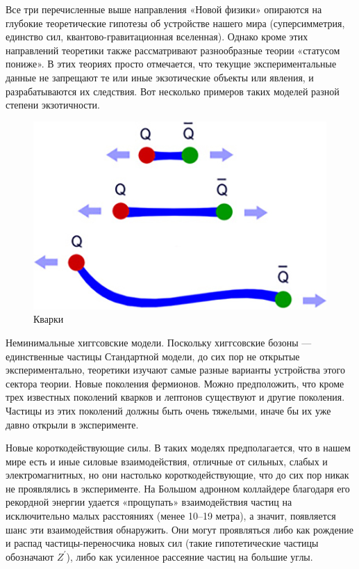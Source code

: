 Все три перечисленные выше направления «Новой физики» опираются на глубокие теоретические гипотезы об устройстве нашего мира (суперсимметрия, единство сил, квантово-гравитационная вселенная). Однако кроме этих направлений теоретики также рассматривают разнообразные теории «статусом пониже». В этих теориях просто отмечается, что текущие экспериментальные данные не запрещают те или иные экзотические объекты или явления, и разрабатываются их следствия. Вот несколько примеров таких моделей разной степени экзотичности.

\begin{figure}[h]
	\centering
	\includegraphics[width=\textwidth]{figures/quirk-antiquirk.jpg}
	\caption{Кварки}
	\label{fig:fig03}
\end{figure}

Неминимальные хиггсовские модели. Поскольку хиггсовские бозоны — единственные частицы Стандартной модели, до сих пор не открытые экспериментально, теоретики изучают самые разные варианты устройства этого сектора теории.
Новые поколения фермионов. Можно предположить, что кроме трех известных поколений кварков и лептонов существуют и другие поколения. Частицы из этих поколений должны быть очень тяжелыми, иначе бы их уже давно открыли в эксперименте.

Новые короткодействующие силы. В таких моделях предполагается, что в нашем мире есть и иные силовые взаимодействия, отличные от сильных, слабых и электромагнитных, но они настолько короткодействующие, что до сих пор никак не проявлялись в эксперименте. На Большом адронном коллайдере благодаря его рекордной энергии удается «прощупать» взаимодействия частиц на исключительно малых расстояниях (менее 10–19 метра), а значит, появляется шанс эти взаимодействия обнаружить. Они могут проявляться либо как рождение и распад частицы-переносчика новых сил (такие гипотетические частицы обозначают $Z^\prime$), либо как усиленное рассеяние частиц на большие углы.

